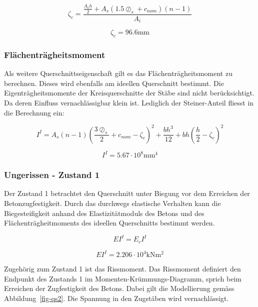 \documentclass[
  12pt,
  letterpaper,
  egregdoesnotlikesansseriftitles]{scrreprt}
\begin{document}
\begin{equation}\zeta_{c} = \frac{\frac{A_{c} h}{2} + A_{s} \left(1.5 \oslash_{s} + c_{nom}\right) \left(n - 1\right)}{A_{i}}\end{equation}

\begin{equation}\zeta_{c} = 96.6 \text{mm}\end{equation}

\subsubsection{Flächenträgheitsmoment}\label{fluxe4chentruxe4gheitsmoment}

Als weitere Querschnittseigenschaft gilt es das Flächenträgheitsmoment
zu berechnen. Dieses wird ebenfalls am ideellen Querschnitt bestimmt.
Die Eigenträgheitsmomente der Kreisquerschnitte der Stäbe sind nicht
berücksichtigt. Da deren Einfluss vernachlässigbar klein ist. Lediglich
der Steiner-Anteil fliesst in die Berechnung ein:

\begin{equation}I^{I} = A_{s} \left(n - 1\right) \left(\frac{3 \oslash_{s}}{2} + c_{nom} - \zeta_{c}\right)^{2} + \frac{b h^{3}}{12} + b h \left(\frac{h}{2} - \zeta_{c}\right)^{2}\end{equation}

\begin{equation}I^{I} = 5.67 \cdot 10^{8} \text{mm}^{4}\end{equation}

\subsubsection{Ungerissen - Zustand 1}\label{ungerissen---zustand-1}

Der Zustand 1 betrachtet den Querschnitt unter Biegung vor dem Erreichen
der Betonzugfestigkeit. Durch das durchwegs elastische Verhalten kann
die Biegesteifigkeit anhand des Elastizitätmoduls des Betons und des
Flächenträgheitmoments des ideellen Querschnitts bestimmt werden.

\begin{equation}EI^{I} = E_{c} I^{I}\end{equation}

\begin{equation}EI^{I} = 2.206 \cdot 10^{4} \text{kN} \text{m}^{2}\end{equation}

Zugehörig zum Zustand 1 ist das Rissmoment. Das Rissmoment definiert den
Endpunkt des Zustands 1 im Momenten-Krümmungs-Diagramm, sprich beim
Erreichen der Zugfestigkeit des Betons. Dabei gilt die Modellierung
gemäss Abbildung~\ref{fig-qs2}. Die Spannung in den Zugstäben wird
vernachlässigt.
\end{document}
